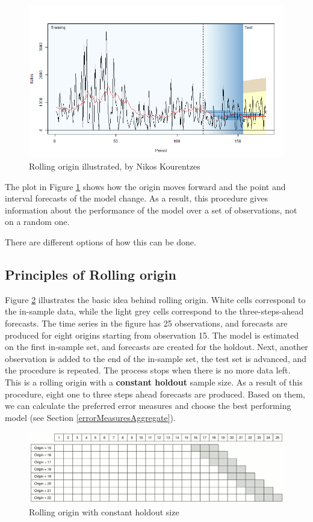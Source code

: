 \documentclass[
]{book}
\theoremstyle{definition}
\theoremstyle{definition}
\theoremstyle{definition}
\theoremstyle{definition}
\theoremstyle{remark}
\begin{document}
\begin{figure}
\includegraphics[width=0.75\linewidth]{./images/03-ROAnimation} \caption{Rolling origin illustrated, by Nikos Kourentzes}\label{fig:ROProcessAnimation}
\end{figure}

The plot in Figure \ref{fig:ROProcessAnimation} shows how the origin moves forward and the point and interval forecasts of the model change. As a result, this procedure gives information about the performance of the model over a set of observations, not on a random one.

There are different options of how this can be done.

\hypertarget{principles-of-rolling-origin}{%
\subsection{Principles of Rolling origin}\label{principles-of-rolling-origin}}

Figure \ref{fig:ROProcessCO} \citep{Svetunkov2017} illustrates the basic idea behind rolling origin. White cells correspond to the in-sample data, while the light grey cells correspond to the three-steps-ahead forecasts. The time series in the figure has 25 observations, and forecasts are produced for eight origins starting from observation 15. The model is estimated on the first in-sample set, and forecasts are created for the holdout. Next, another observation is added to the end of the in-sample set, the test set is advanced, and the procedure is repeated. The process stops when there is no more data left. This is a rolling origin with a \textbf{constant holdout} sample size. As a result of this procedure, eight one to three steps ahead forecasts are produced. Based on them, we can calculate the preferred error measures and choose the best performing model (see Section \ref{errorMeasuresAggregate}).

\begin{figure}
\includegraphics[width=0.75\linewidth]{./images/03-ROProcessCO} \caption{Rolling origin with constant holdout size}\label{fig:ROProcessCO}
\end{figure}
\end{document}

